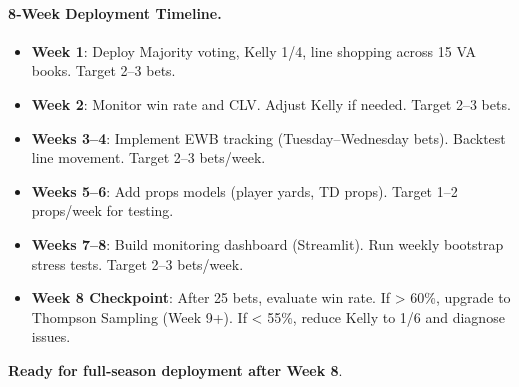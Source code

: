 \paragraph{8‑Week Deployment Timeline.}
\begin{itemize}
\item \textbf{Week 1}: Deploy Majority voting, Kelly 1/4, line shopping across 15 VA books. Target 2--3 bets.
\item \textbf{Week 2}: Monitor win rate and CLV. Adjust Kelly if needed. Target 2--3 bets.
\item \textbf{Weeks 3--4}: Implement EWB tracking (Tuesday--Wednesday bets). Backtest line movement. Target 2--3 bets/week.
\item \textbf{Weeks 5--6}: Add props models (player yards, TD props). Target 1--2 props/week for testing.
\item \textbf{Weeks 7--8}: Build monitoring dashboard (Streamlit). Run weekly bootstrap stress tests. Target 2--3 bets/week.
\item \textbf{Week 8 Checkpoint}: After 25 bets, evaluate win rate. If > 60\%, upgrade to Thompson Sampling (Week 9+). If < 55\%, reduce Kelly to 1/6 and diagnose issues.
\end{itemize}

\textbf{Ready for full‑season deployment after Week 8}.



